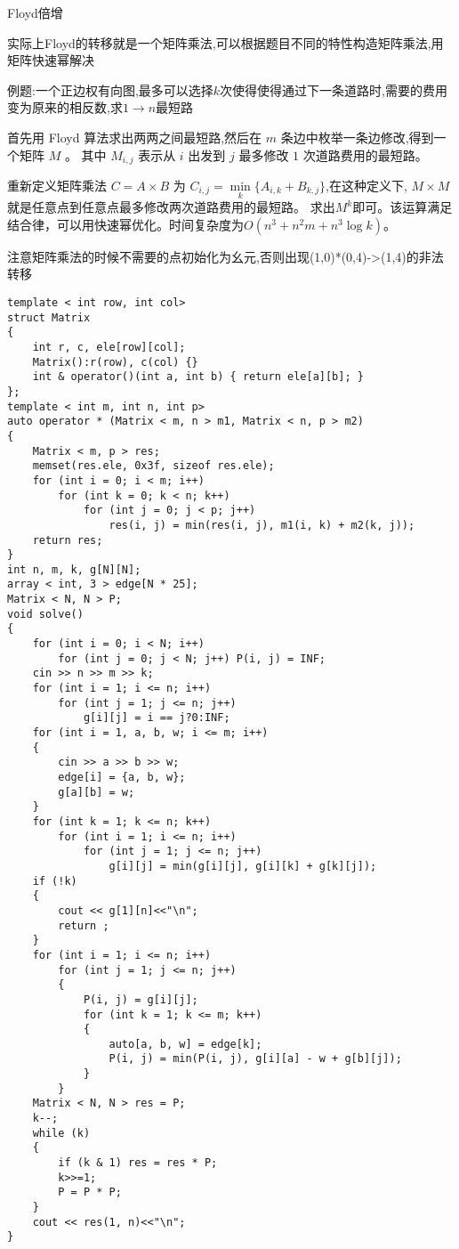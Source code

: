 \documentclass[a4paper,fontset=none]{ctexart}
\begin{document}
Floyd倍增

实际上Floyd的转移就是一个矩阵乘法,可以根据题目不同的特性构造矩阵乘法,用矩阵快速幂解决

例题:一个正边权有向图,最多可以选择$k$次使得使得通过下一条道路时,需要的费用变为原来的相反数,求$1\rightarrow n$最短路

首先用 Floyd 算法求出两两之间最短路,然后在 $m$ 条边中枚举一条边修改,得到一个矩阵 $M$ 。
其中 $M_{i,j}$ 表示从 $i$ 出发到 $j$ 最多修改 $1$ 次道路费用的最短路。

重新定义矩阵乘法 $C=A\times B$ 为 $C_{i,j}=\min\limits_k\{A_{i,k}+B_{k,j}\}$,在这种定义下,
$M\times M$ 就是任意点到任意点最多修改两次道路费用的最短路。
求出$M^k$即可。该运算满足结合律，可以用快速幂优化。时间复杂度为$O(n^3+n^2m+n^3\log k)$。

注意矩阵乘法的时候不需要的点初始化为幺元,否则出现(1,0)*(0,4)->(1,4)的非法转移

\begin{verbatim}
template < int row, int col>
struct Matrix
{
    int r, c, ele[row][col];
    Matrix():r(row), c(col) {}
    int & operator()(int a, int b) { return ele[a][b]; }
};
template < int m, int n, int p>
auto operator * (Matrix < m, n > m1, Matrix < n, p > m2)
{
    Matrix < m, p > res;
    memset(res.ele, 0x3f, sizeof res.ele);
    for (int i = 0; i < m; i++)
        for (int k = 0; k < n; k++)
            for (int j = 0; j < p; j++)
                res(i, j) = min(res(i, j), m1(i, k) + m2(k, j));
    return res;
}
int n, m, k, g[N][N];
array < int, 3 > edge[N * 25];
Matrix < N, N > P;
void solve()
{
    for (int i = 0; i < N; i++)
        for (int j = 0; j < N; j++) P(i, j) = INF;
    cin >> n >> m >> k;
    for (int i = 1; i <= n; i++)
        for (int j = 1; j <= n; j++)
            g[i][j] = i == j?0:INF;
    for (int i = 1, a, b, w; i <= m; i++)
    {
        cin >> a >> b >> w;
        edge[i] = {a, b, w};
        g[a][b] = w;
    }
    for (int k = 1; k <= n; k++)
        for (int i = 1; i <= n; i++)
            for (int j = 1; j <= n; j++)
                g[i][j] = min(g[i][j], g[i][k] + g[k][j]);
    if (!k)
    {
        cout << g[1][n]<<"\n";
        return ;
    }
    for (int i = 1; i <= n; i++)
        for (int j = 1; j <= n; j++)
        {
            P(i, j) = g[i][j];
            for (int k = 1; k <= m; k++)
            {
                auto[a, b, w] = edge[k];
                P(i, j) = min(P(i, j), g[i][a] - w + g[b][j]);
            }
        }
    Matrix < N, N > res = P;
    k--;
    while (k)
    {
        if (k & 1) res = res * P;
        k>>=1;
        P = P * P;
    }
    cout << res(1, n)<<"\n";
}
\end{verbatim}
\end{document}
